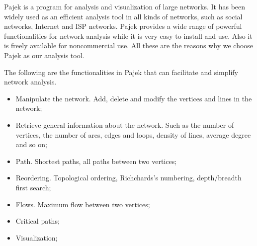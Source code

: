 Pajek \cite{batagelj1998pajek} is a program for analysis and visualization of large networks. It has been widely used as an efficient analysis tool in all kinds of networks, such as social networks, Internet and ISP networks. Pajek provides a wide range of powerful functionalities for network analysis while it is very easy to install and use. Also it is freely available for noncommercial use. All these are the reasons why we choose Pajek as our analysis tool.  



The following are the functionalities in Pajek that can facilitate and simplify network analysis.
\begin{itemize}
\item Manipulate the network. Add, delete and modify the vertices and lines in the network;
\item Retrieve general information about the network. Such as the number of vertices, the number of arcs, edges and loops, density of lines, average degree and so on;
\item Path. Shortest paths, all paths between two vertices;
\item Reordering. Topological ordering, Richchards's numbering, depth/breadth first search;
\item Flows. Maximum flow between two vertices;
\item Critical paths;
\item Visualization;
\end{itemize}

